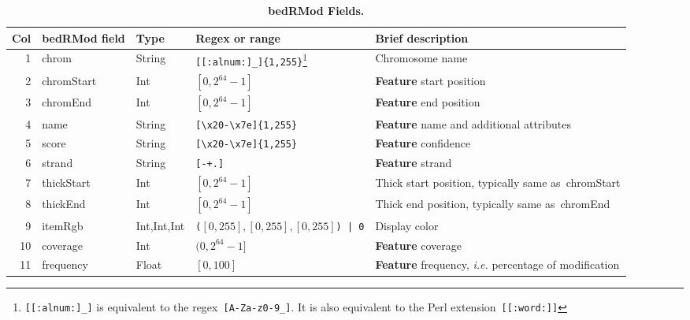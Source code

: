 \documentclass[11pt]{article}
\begin{document}
\begin{savenotes}
  \begin{table}[H]
    \begin{adjustwidth}{-0.5in}{-0.5in}
      \begin{tabularx}{\linewidth}{r l l l L}
        \toprule
        Col & \acs{bedRMod} field & Type & Regex or range & Brief description \\
        & \textsf{chrom}
        & String
        & \texttt{[[:alnum:]\_]\{1,255\}}\footnote{\texttt{[[:alnum:]\_]} is equivalent to the \ac{regex}~\texttt{[A-Za-z0-9\_]}. %
        It is also equivalent to the Perl extension~\texttt{[[:word:]]}}
        & Chromosome name \\
        2 & \textsf{chromStart} & Int & $[0, 2^{64}-1]$ & \textbf{Feature} start position \\
        3 & \textsf{chromEnd} & Int & $[0, 2^{64} -1]$ & \textbf{Feature} end position \\
        4 
        & \textsf{name} 
        & String 
        & \texttt{[{\textbackslash}x20-{\textbackslash}x7e]\{1,255\}} 
        & \textbf{Feature} name and additional attributes \\
        5 & \textsf{score} & String & \texttt{[{\textbackslash}x20-{\textbackslash}x7e]\{1,255\}} & \textbf{Feature} confidence \\
        6 & \textsf{strand} & String & \texttt{[-+.]} & \textbf{Feature} strand \\
        7 & \textsf{thickStart} & Int & $[0, 2^{64}-1]$ & Thick start position, typically same as~\textsf{chromStart} \\
        8 & \textsf{thickEnd} & Int & $[0, 2^{64}-1]$ & Thick end position, typically same as~\textsf{chromEnd} \\
        9 & \textsf{itemRgb} & Int,Int,Int & \texttt{(}$[0, 255], [0,255], [0,255]$\texttt{) | 0} & Display color \\ %
        10 & \textsf{coverage} & Int &  $(0, 2^{64}-1]$ & \textbf{Feature} coverage \\
        11 & \textsf{frequency} & Float & $[0, 100]$ & \textbf{Feature} frequency, \textit{i.e.} percentage of modification \\
        \bottomrule
      \end{tabularx}
    \end{adjustwidth}
    \caption{\textbf{\acs{bedRMod} Fields.}}\label{tab:fields}
  \end{table}
\end{savenotes}
\end{document}

